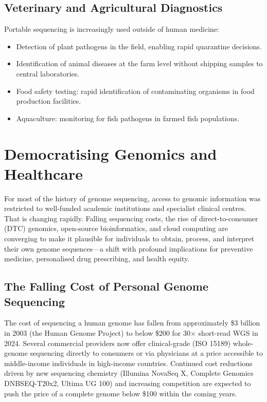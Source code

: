 \subsection{Veterinary and Agricultural Diagnostics}
\label{subsec:emerging:vet-ag}

Portable sequencing is increasingly used outside of human medicine:
\begin{itemize}[itemsep=2pt]
  \item Detection of plant pathogens in the field, enabling rapid quarantine decisions.
  \item Identification of animal diseases at the farm level without shipping samples to central laboratories.
  \item Food safety testing: rapid identification of contaminating organisms in food production facilities.
  \item Aquaculture: monitoring for fish pathogens in farmed fish populations.
\end{itemize}


\section{Democratising Genomics and Healthcare}
\label{sec:emerging:democratisation}

For most of the history of genome sequencing, access to genomic information was restricted to well-funded academic institutions and specialist clinical centres. That is changing rapidly. Falling sequencing costs, the rise of direct-to-consumer (DTC) genomics, open-source bioinformatics, and cloud computing are converging to make it plausible for individuals to obtain, process, and interpret their own genome sequences---a shift with profound implications for preventive medicine, personalised drug prescribing, and health equity.

\subsection{The Falling Cost of Personal Genome Sequencing}
\label{subsec:demo:cost}

The cost of sequencing a human genome has fallen from approximately \$3 billion in 2003 (the Human Genome Project) to below \$200 for 30$\times$ short-read WGS in 2024. Several commercial providers now offer clinical-grade (ISO 15189) whole-genome sequencing directly to consumers or via physicians at a price accessible to middle-income individuals in high-income countries. Continued cost reductions driven by new sequencing chemistry (Illumina NovaSeq X, Complete Genomics DNBSEQ-T20x2, Ultima UG 100) and increasing competition are expected to push the price of a complete genome below \$100 within the coming years.

